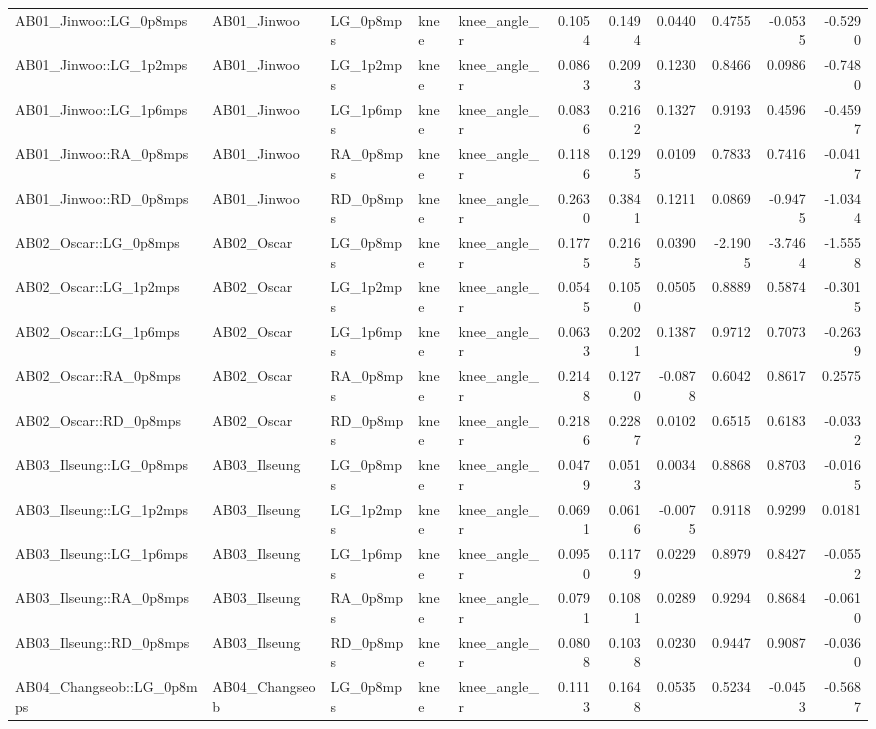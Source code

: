 \begin{table}
\begin{tabular}{lllllrrrrrr}
AB01_Jinwoo::LG_0p8mps & AB01_Jinwoo & LG_0p8mps & knee & knee_angle_r & 0.1054 & 0.1494 & 0.0440 & 0.4755 & -0.0535 & -0.5290 \\
AB01_Jinwoo::LG_1p2mps & AB01_Jinwoo & LG_1p2mps & knee & knee_angle_r & 0.0863 & 0.2093 & 0.1230 & 0.8466 & 0.0986 & -0.7480 \\
AB01_Jinwoo::LG_1p6mps & AB01_Jinwoo & LG_1p6mps & knee & knee_angle_r & 0.0836 & 0.2162 & 0.1327 & 0.9193 & 0.4596 & -0.4597 \\
AB01_Jinwoo::RA_0p8mps & AB01_Jinwoo & RA_0p8mps & knee & knee_angle_r & 0.1186 & 0.1295 & 0.0109 & 0.7833 & 0.7416 & -0.0417 \\
AB01_Jinwoo::RD_0p8mps & AB01_Jinwoo & RD_0p8mps & knee & knee_angle_r & 0.2630 & 0.3841 & 0.1211 & 0.0869 & -0.9475 & -1.0344 \\
AB02_Oscar::LG_0p8mps & AB02_Oscar & LG_0p8mps & knee & knee_angle_r & 0.1775 & 0.2165 & 0.0390 & -2.1905 & -3.7464 & -1.5558 \\
AB02_Oscar::LG_1p2mps & AB02_Oscar & LG_1p2mps & knee & knee_angle_r & 0.0545 & 0.1050 & 0.0505 & 0.8889 & 0.5874 & -0.3015 \\
AB02_Oscar::LG_1p6mps & AB02_Oscar & LG_1p6mps & knee & knee_angle_r & 0.0633 & 0.2021 & 0.1387 & 0.9712 & 0.7073 & -0.2639 \\
AB02_Oscar::RA_0p8mps & AB02_Oscar & RA_0p8mps & knee & knee_angle_r & 0.2148 & 0.1270 & -0.0878 & 0.6042 & 0.8617 & 0.2575 \\
AB02_Oscar::RD_0p8mps & AB02_Oscar & RD_0p8mps & knee & knee_angle_r & 0.2186 & 0.2287 & 0.0102 & 0.6515 & 0.6183 & -0.0332 \\
AB03_Ilseung::LG_0p8mps & AB03_Ilseung & LG_0p8mps & knee & knee_angle_r & 0.0479 & 0.0513 & 0.0034 & 0.8868 & 0.8703 & -0.0165 \\
AB03_Ilseung::LG_1p2mps & AB03_Ilseung & LG_1p2mps & knee & knee_angle_r & 0.0691 & 0.0616 & -0.0075 & 0.9118 & 0.9299 & 0.0181 \\
AB03_Ilseung::LG_1p6mps & AB03_Ilseung & LG_1p6mps & knee & knee_angle_r & 0.0950 & 0.1179 & 0.0229 & 0.8979 & 0.8427 & -0.0552 \\
AB03_Ilseung::RA_0p8mps & AB03_Ilseung & RA_0p8mps & knee & knee_angle_r & 0.0791 & 0.1081 & 0.0289 & 0.9294 & 0.8684 & -0.0610 \\
AB03_Ilseung::RD_0p8mps & AB03_Ilseung & RD_0p8mps & knee & knee_angle_r & 0.0808 & 0.1038 & 0.0230 & 0.9447 & 0.9087 & -0.0360 \\
AB04_Changseob::LG_0p8mps & AB04_Changseob & LG_0p8mps & knee & knee_angle_r & 0.1113 & 0.1648 & 0.0535 & 0.5234 & -0.0453 & -0.5687 \\

\end{tabular}
\end{table}
